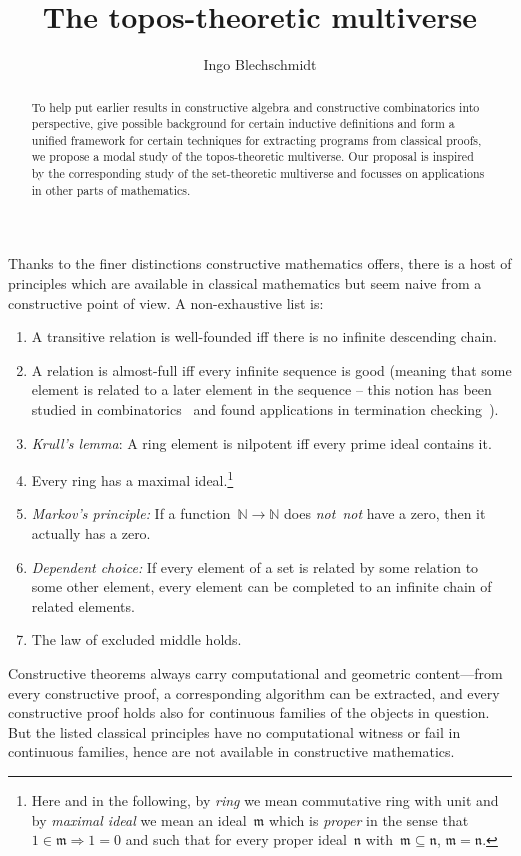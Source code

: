 \documentclass[oneside,reqno]{amsart}
\title{The topos-theoretic multiverse}
\author{Ingo Blechschmidt}
\theoremstyle{definition}
\theoremstyle{plain}
\theoremstyle{remark}
\newcommand{\mmm}{\mathfrak{m}}
\newcommand{\nnn}{\mathfrak{n}}
\newcommand{\NN}{\mathbb{N}}
\renewcommand{\_}{\mathpunct{.}\,}
\newcommand{\notnot}{\emph{not~not}\xspace}
\newcommand{\?}{\,{:}\,}
\begin{document}
\begin{abstract}
  To help put earlier results in constructive algebra and constructive
  combinatorics into perspective, give possible background for certain
  inductive definitions and form a unified framework for certain techniques for
  extracting programs from classical proofs, we propose a modal study of the
  topos-theoretic multiverse. Our proposal is inspired by the corresponding study
  of the set-theoretic multiverse and focusses on applications in other
  parts of mathematics.
\end{abstract}

\maketitle
\thispagestyle{empty}

\noindent
Thanks to the finer distinctions constructive mathematics offers, there is a
host of principles which are available in classical mathematics but seem naive
from a constructive point of view. A non-exhaustive list is:
\begin{enumerate}
\renewcommand{\theenumi}{\arabic{enumi}*}
\item A transitive relation is well-founded iff there is no infinite descending
chain.
\item A relation is almost-full iff every infinite sequence is good (meaning
that some element is related to a later element in the sequence -- this
notion has been studied in combinatorics~\cite{xxx} and found applications in
termination checking~\cite{xxx}).
\item \emph{Krull's lemma}: A ring element is nilpotent iff every prime
ideal contains it.
\item Every ring has a maximal ideal.\footnote{Here and in the following, by
\emph{ring} we mean commutative ring with unit and by \emph{maximal ideal} we
mean an ideal~$\mmm$ which is \emph{proper} in the sense that~$1 \in \mmm
\Rightarrow 1 = 0$ and such that for every proper ideal~$\nnn$ with~$\mmm
\subseteq \nnn$, $\mmm = \nnn$.}
\item \emph{Markov's principle:} If a function~$\NN \to \NN$ does \notnot have
a zero, then it actually has a zero.
\item \emph{Dependent choice:} If every element of a set is related by some relation to some other
element, every element can be completed to an infinite chain of related
elements.
\item The law of excluded middle holds.
\end{enumerate}
Constructive theorems always carry computational and geometric
content---from every constructive proof, a corresponding algorithm can be
extracted, and every constructive proof holds also for continuous families of
the objects in question. But the listed classical principles have no
computational witness or fail in continuous families, hence are not
available in constructive mathematics.
\end{document}
